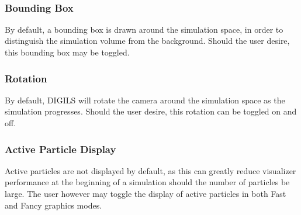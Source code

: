 \documentclass[fleqn,10pt]{UserGuideArx} %
\begin{document}
~\\
\subsubsection{Bounding Box}
By default, a bounding box is drawn around the simulation space, in order to distinguish the simulation volume from the background. Should the user desire, this bounding box may be toggled.\\

\subsubsection{Rotation}
By default, DIGILS will rotate the camera around the simulation space as the simulation progresses. Should the user desire, this rotation can be toggled on and off.\\

\subsubsection{Active Particle Display}
Active particles are not displayed by default, as this can greatly reduce visualizer performance at the beginning of a simulation should the number of particles be large. The user however may toggle the display of active particles in both Fast and Fancy graphics modes.\\
\end{document}
